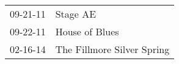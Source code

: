\begin{supertabular}{p{0.07\textwidth}p{0.23\textwidth}}
 09-21-11 &                    Stage AE \\
 09-22-11 &              House of Blues \\
 02-16-14 &  The Fillmore Silver Spring \\
\end{supertabular}
